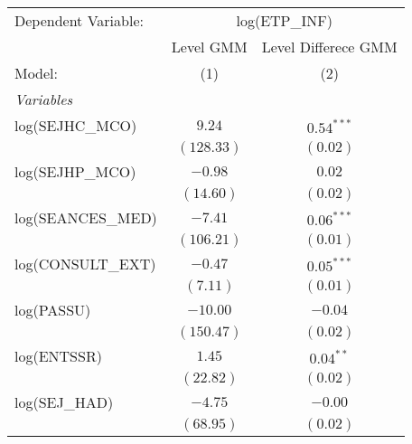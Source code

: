 
\begingroup
\centering
\begin{tabular}{lcc}
    \tabularnewline \midrule \midrule
    Dependent Variable:             & \multicolumn{2}{c}{log(ETP\_INF)}                       \\
                                    & Level GMM                         & Level Differece GMM \\
    Model:                          & (1)                               & (2)                 \\
    \midrule
    \emph{Variables}                                                                          \\
    log(SEJHC\_MCO)                 & $9.24$                            & $0.54^{***}$        \\
                                    & $(128.33)$                        & $(0.02)$            \\
    log(SEJHP\_MCO)                 & $-0.98$                           & $0.02$              \\
                                    & $(14.60)$                         & $(0.02)$            \\
    log(SEANCES\_MED)               & $-7.41$                           & $0.06^{***}$        \\
                                    & $(106.21)$                        & $(0.01)$            \\
    log(CONSULT\_EXT)               & $-0.47$                           & $0.05^{***}$        \\
                                    & $(7.11)$                          & $(0.01)$            \\
    log(PASSU)                      & $-10.00$                          & $-0.04$             \\
                                    & $(150.47)$                        & $(0.02)$            \\
    log(ENTSSR)                     & $1.45$                            & $0.04^{**}$         \\
                                    & $(22.82)$                         & $(0.02)$            \\
    log(SEJ\_HAD)                   & $-4.75$                           & $-0.00$             \\
                                    & $(68.95)$                         & $(0.02)$            \\

\end{tabular}
